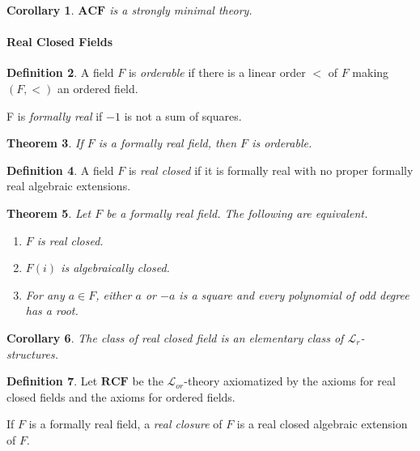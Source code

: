 \documentclass{amsart}
\newtheorem{theorem}{Theorem}[section]
\newtheorem{corollary}[theorem]{Corollary}
\theoremstyle{definition}
\newtheorem{definition}[theorem]{Definition}
\numberwithin{equation}{section}
\begin{document}
\begin{corollary}
    $\mathbf{ACF}$ is a strongly minimal theory.
\end{corollary}

\paragraph{\bfseries Real Closed Fields}

\begin{definition}
    A field $F$ is \emph{orderable} if there is a linear order $<$ of $F$ making $(F,<)$ an ordered field.

    F is \emph{formally real} if $-1$ is not a sum of squares.
\end{definition}

\begin{theorem}
    If $F$ is a formally real field, then $F$ is orderable.
\end{theorem}

\begin{definition}
    A field $F$ is \emph{real closed} if it is formally real with no proper formally real algebraic extensions.
\end{definition}

\begin{theorem}
    Let $F$ be a formally real field. The following are equivalent.
    \begin{enumerate}[label = {\roman*)}]
        \item $F$ is real closed.
        \item $F(i)$ is algebraically closed.
        \item For any $a\in F$, either $a$ or $-a$ is a square and every polynomial of odd degree has a root.
    \end{enumerate}
\end{theorem}

\begin{corollary}
    The class of real closed field is an elementary class of 
    $\mathcal{L}_r$-structures.
\end{corollary}

\begin{definition}
    Let $\mathbf{RCF}$ be the $\mathcal{L}_{or}$-theory axiomatized by the axioms for real closed fields and the axioms for ordered fields.

    If $F$ is a formally real field, a \emph{real closure} of $F$ is a real closed algebraic extension of $F$.
\end{definition}
\end{document}
